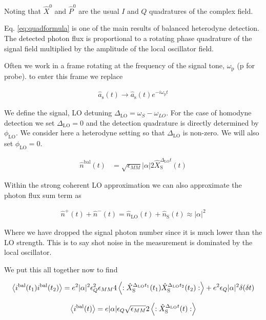 \documentclass[12pt]{article}
\newcommand{\ep}{\epsilon}
\begin{document}
Noting that $\hat{X}^0$ and $\hat{P}^0$ are the usual $I$ and $Q$ quadratures of the complex field.


Eq. \eqref{eq:quadformula} is one of the main results of balanced heterodyne detection. The detected photon flux is proportional to a rotating phase quadrature of the signal field multiplied by the amplitude of the local oscillator field.

Often we work in a frame rotating at the frequency of the signal tone, $\omega_{\text{p}}$ (p for probe). to enter this frame we replace 

\begin{align}
\hat{a}_{\text{s}}(t) \rightarrow \hat{a}_{\text{s}}(t)e^{-i\omega_{\text{p}}t}
\end{align}

We define the signal, LO detuning $\Delta_{\text{LO}} = \omega_{S} - \omega_{LO}$. For the case of homodyne detection we set $\Delta_{\text{LO}} = 0$ and the detection quadrature is directly determined by $\phi_{\text{LO}}$. We consider here a heterodyne setting so that $\Delta_{\text{LO}}$ is non-zero. We will also set $\phi_{\text{LO}} = 0$.

\begin{align}
\hat{n}^{\text{bal}}(t) &= \sqrt{\ep_{MM}}|\alpha|2\hat{X}_{\text{S}}^{\Delta_{\text{LO}}t}(t)
\end{align}

Within the strong coherent LO approximation we can also approximate the photon flux sum term as

\begin{align}
\hat{n}^+(t) + \hat{n}^-(t) = \hat{n}_{\text{LO}}(t) + \hat{n}_{\text{S}}(t) \approx |\alpha|^2
\end{align}

Where we have dropped the signal photon number since it is much lower than the LO strength. This is to say shot noise in the measurement is dominated by the local oscillator.

We put this all together now to find

\begin{align}
\Braket{i^{\text{bal}}(t_1)i^{\text{bal}}(t_2)} = e^2 |\alpha|^2 \ep_Q^2 \ep_{MM} 4\Braket{:\hat{X}_{\text{S}}^{\Delta_{\text{LO}}t_1}(t_1)\hat{X}_{\text{S}}^{\Delta_{\text{LO}}t_2}(t_2) :} + e^2 \ep_Q |\alpha|^2 \delta(\delta t)
\end{align}

\begin{align}
\Braket{i^{\text{bal}}(t)} = e |\alpha| \ep_Q \sqrt{\ep_{MM}} 2\Braket{:\hat{X}^{\Delta_{\text{LO}}t}_{\text{S}}(t):}
\end{align}
\end{document}
